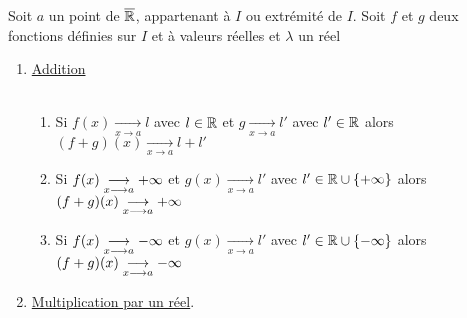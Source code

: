 \begin{defprop}
    Soit \(a\) un point de \(\overline{\mathbb{R}}\), appartenant à \(I\) ou extrémité de \(I\).
    Soit \(f\) et \(g\) deux fonctions définies sur \(I\) et à valeurs réelles et \(\lambda\) un réel
    \begin{enumerate}
        \item \underline{Addition} \\~\\
        \begin{enumerate}
            \item Si \(f(x) \underset{x\to a}{\to} l\) avec \(l \in \mathbb{R}\) et \(g \underset{x\to a}{\to} l'\) avec \(l' \in \mathbb{R}\) alors \((f+g)(x) \underset{x\to a}{\to} l + l'\)
            \item Si \(f(x) \underset{x\longrightarrow a}{\longrightarrow} +\infty\)  et \(g(x)\underset{x\to a}{\to} l'\) avec \(l' \in \mathbb{R} \cup \left\lbrace+\infty\right\rbrace\) alors \((f+g)(x) \underset{x\longrightarrow a}{\longrightarrow} +\infty\)
            \item     Si \(f(x) \underset{x\longrightarrow a}{\longrightarrow}-\infty\)  et \(g(x)\underset{x\to a}{\to} l'\) avec \(l' \in \mathbb{R} \cup \left\lbrace-\infty\right\rbrace\) alors \((f+g)(x)\underset{x\longrightarrow a}{\longrightarrow} -\infty\)
        \end{enumerate}
        \item \underline{Multiplication par un réel}.\\~\\
\end{enumerate}
\end{defprop}
